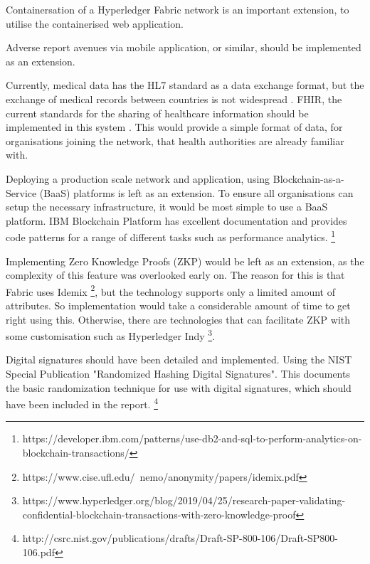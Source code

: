 Containersation of a Hyperledger Fabric network is an important extension, to utilise the containerised web application. 

Adverse report avenues via mobile application, or similar, should be implemented as an extension. 

Currently, medical data has the HL7 standard as a data exchange format, but the exchange of medical records between countries is not widespread \cite{kung_personal_2020}.
FHIR, the current standards for the sharing of healthcare information should be implemented in this system \cite{noauthor_overview_nodate}. 
This would provide a simple format of data, for organisations joining the network, that health authorities are already familiar with. 

Deploying a production scale network and application, using Blockchain-as-a-Service (BaaS) platforms is left as an extension. 
To ensure all organisations can setup the necessary infrastructure, it would be most simple to use a BaaS platform.
IBM Blockchain Platform has excellent documentation and provides code patterns for a range of different tasks such as performance analytics. \footnote{https://developer.ibm.com/patterns/use-db2-and-sql-to-perform-analytics-on-blockchain-transactions/}

Implementing Zero Knowledge Proofs (ZKP) would be left as an extension, as the complexity of this feature was overlooked early on. 
The reason for this is that Fabric uses Idemix \footnote{https://www.cise.ufl.edu/~nemo/anonymity/papers/idemix.pdf}, but the technology supports only a limited amount of attributes. 
So implementation would take a considerable amount of time to get right using this. 
Otherwise, there are technologies that can facilitate ZKP with some customisation such as Hyperledger Indy \footnote{https://www.hyperledger.org/blog/2019/04/25/research-paper-validating-confidential-blockchain-transactions-with-zero-knowledge-proof}.

Digital signatures should have been detailed and implemented. Using the NIST Special Publication "Randomized Hashing Digital Signatures". 
This documents the basic randomization technique for use with digital signatures, which should have been included in the report. \footnote{http://csrc.nist.gov/publications/drafts/Draft-SP-800-106/Draft-SP800-106.pdf} 
